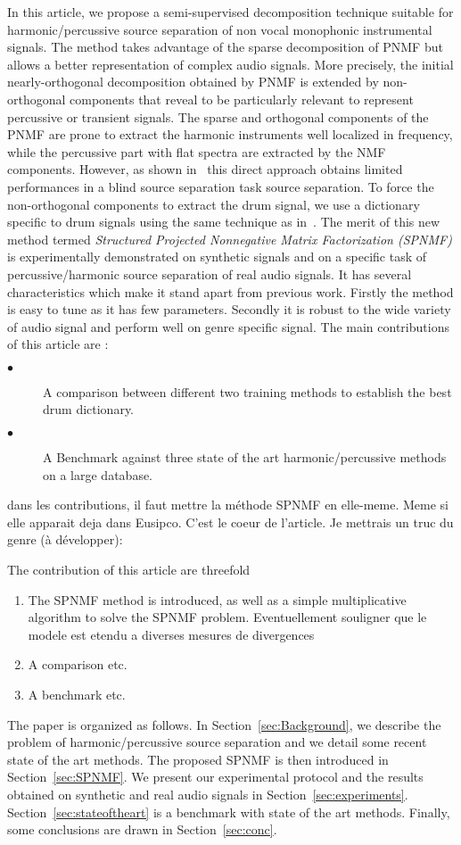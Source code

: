 In this article, we propose a semi-supervised decomposition technique suitable for harmonic/percussive source separation of non vocal monophonic instrumental signals. The method takes advantage of the sparse decomposition of PNMF but allows a better representation of complex audio signals. More precisely, the initial nearly-orthogonal decomposition obtained by PNMF is extended by non-orthogonal components that reveal to be particularly relevant to represent percussive or transient signals. The sparse and orthogonal components of the PNMF are prone to extract the harmonic instruments well localized in frequency, while the percussive part with flat spectra are extracted by the NMF components. However, as shown in~\cite{laroche2015structured} this direct approach obtains limited performances in a blind source separation task source separation. To force the non-orthogonal components to extract the drum signal, we use a dictionary specific to drum signals using the same technique as in~\cite{wudrum}.
The merit of this new method termed \textit{Structured Projected Nonnegative Matrix Factorization (SPNMF)} is experimentally demonstrated on synthetic signals and on a specific task of percussive/harmonic source separation of real audio signals. It has several characteristics which make it stand apart from previous work. Firstly the method is easy to tune as it has few parameters. Secondly it is robust to the wide variety of audio signal and perform well on genre specific signal. The main contributions of this article are :
\begin{description}
\item[$\bullet$ ] A comparison between different two training methods to establish the best drum dictionary.
\item[$\bullet$ ] A Benchmark against three state of the art harmonic/percussive methods on a large database.
\end{description}
{\MK dans les contributions, il faut mettre la méthode SPNMF en elle-meme. Meme si elle apparait deja dans Eusipco. C'est le coeur de l'article. Je mettrais un truc du genre (à développer):


The contribution of this article are threefold
\begin{enumerate}
\item The SPNMF method is introduced, as well as a simple multiplicative algorithm to solve the SPNMF problem. Eventuellement souligner que le modele est etendu a diverses mesures de divergences
\item A comparison etc.
\item A benchmark etc.	
\end{enumerate}

}

The paper is organized as follows. In Section~\ref{sec:Background}, we describe the problem of harmonic/percussive source separation and we detail some recent state of the art methods. The proposed SPNMF is then introduced in Section~\ref{sec:SPNMF}. We present our experimental protocol and the results obtained on synthetic and real audio signals in Section~\ref{sec:experiments}. Section~\ref{sec:stateoftheart} is a benchmark with state of the art methods. Finally, some conclusions are drawn in Section~\ref{sec:conc}.


